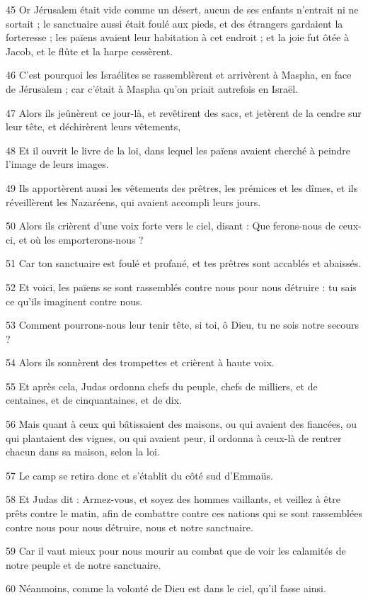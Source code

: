 \par 45 Or Jérusalem était vide comme un désert, aucun de ses enfants n'entrait ni ne sortait ; le sanctuaire aussi était foulé aux pieds, et des étrangers gardaient la forteresse ; les païens avaient leur habitation à cet endroit ; et la joie fut ôtée à Jacob, et le flûte et la harpe cessèrent.
\par 46 C'est pourquoi les Israélites se rassemblèrent et arrivèrent à Maspha, en face de Jérusalem ; car c'était à Maspha qu'on priait autrefois en Israël.
\par 47 Alors ils jeûnèrent ce jour-là, et revêtirent des sacs, et jetèrent de la cendre sur leur tête, et déchirèrent leurs vêtements,
\par 48 Et il ouvrit le livre de la loi, dans lequel les païens avaient cherché à peindre l'image de leurs images.
\par 49 Ils apportèrent aussi les vêtements des prêtres, les prémices et les dîmes, et ils réveillèrent les Nazaréens, qui avaient accompli leurs jours.
\par 50 Alors ils crièrent d'une voix forte vers le ciel, disant : Que ferons-nous de ceux-ci, et où les emporterons-nous ?
\par 51 Car ton sanctuaire est foulé et profané, et tes prêtres sont accablés et abaissés.
\par 52 Et voici, les païens se sont rassemblés contre nous pour nous détruire : tu sais ce qu'ils imaginent contre nous.
\par 53 Comment pourrons-nous leur tenir tête, si toi, ô Dieu, tu ne sois notre secours ?
\par 54 Alors ils sonnèrent des trompettes et crièrent à haute voix.
\par 55 Et après cela, Judas ordonna chefs du peuple, chefs de milliers, et de centaines, et de cinquantaines, et de dix.
\par 56 Mais quant à ceux qui bâtissaient des maisons, ou qui avaient des fiancées, ou qui plantaient des vignes, ou qui avaient peur, il ordonna à ceux-là de rentrer chacun dans sa maison, selon la loi.
\par 57 Le camp se retira donc et s'établit du côté sud d'Emmaüs.
\par 58 Et Judas dit : Armez-vous, et soyez des hommes vaillants, et veillez à être prêts contre le matin, afin de combattre contre ces nations qui se sont rassemblées contre nous pour nous détruire, nous et notre sanctuaire.
\par 59 Car il vaut mieux pour nous mourir au combat que de voir les calamités de notre peuple et de notre sanctuaire.
\par 60 Néanmoins, comme la volonté de Dieu est dans le ciel, qu'il fasse ainsi.

